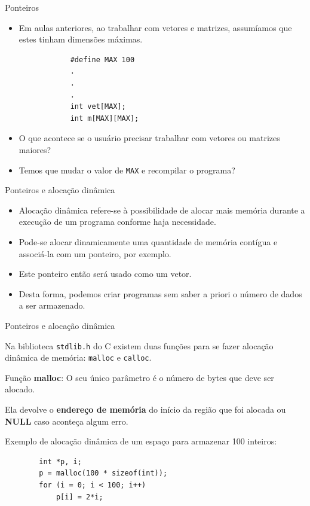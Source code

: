 \documentclass[handout]{beamer}
\newcommand{\cod}[1]{\texttt{#1}}
\begin{document}
\begin{frame}[fragile]{Ponteiros}

    \begin{itemize}[<+->]
        \item Em aulas anteriores, ao trabalhar com vetores e matrizes, assumíamos que estes tinham dimensões máximas.

        \begin{verbatim}
            #define MAX 100
            .
            .
            .
            int vet[MAX];
            int m[MAX][MAX];
        \end{verbatim}

        \item O que acontece se o usuário precisar trabalhar com vetores ou matrizes maiores?
        \item Temos que mudar o valor de \cod{MAX} e recompilar o programa?
  \end{itemize}

\end{frame}

\begin{frame}[fragile]{Ponteiros e alocação dinâmica}

    \begin{itemize}[<+->]
        \item Alocação dinâmica refere-se à possibilidade de alocar mais memória durante a execução de um programa conforme haja necessidade.
        \item Pode-se alocar dinamicamente uma quantidade de memória contígua e associá-la com um ponteiro, por exemplo.
        \item Este ponteiro então será usado como um vetor.
        \item Desta forma, podemos criar programas sem saber a priori o número de dados a ser armazenado.
    \end{itemize}

\end{frame}

\begin{frame}[fragile]{Ponteiros e alocação dinâmica}

    Na biblioteca \texttt{stdlib.h} do C existem duas funções para se fazer alocação dinâmica de memória: \cod{malloc} e \cod{calloc}.

    \pause

    Função {\bf malloc}: O seu único parâmetro é o número de \alert{bytes} que deve ser alocado.

    Ela devolve o {\bf endereço de memória} do início da região que foi alocada ou {\bf NULL} caso aconteça algum erro.

    \pause

    Exemplo de alocação dinâmica de um espaço para armazenar 100 inteiros:
    \begin{verbatim}
        int *p, i;
        p = malloc(100 * sizeof(int));
        for (i = 0; i < 100; i++)
            p[i] = 2*i;
    \end{verbatim}

\end{frame}
\end{document}

